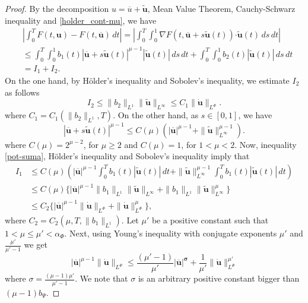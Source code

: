 \documentclass[twoside]{article}
\theoremstyle{remark}
\newcommand{\orlnor}{\|_{L^{\Phi}}}
\renewcommand{\b}[1]{\boldsymbol{#1}}
\newcommand{\ccdot}{\b{\cdot}}
\renewcommand{\leq}{\leqslant}
\begin{document}
\begin{proof} 
By the decomposition $u=\overline{u}+\b{\tilde{u}}$,  Mean Value Theorem, Cauchy-Schwarz inequality 
and \eqref{holder_cont-mu}, we have
\begin{equation}\label{cota-diferencia-F}
\begin{split}
&\left|\int_0^T F(t,\b{u})-F(t,\b{\overline{u}})\,dt\right|=
\left|\int_0^T \int_0^1 \nabla F(t,\b{\overline{u}}+s\b{\tilde{u}}(t))\ccdot \b{\tilde{u}}(t) \,ds \,dt\right|
\\
&\leq \int_0^T \int_0^1 b_1(t)|\b{\overline{u}}+s\b{\tilde{u}}(t)|^{\mu-1}|\b{\tilde{u}}(t)|\,ds\,dt+
\int_0^T \int_0^1 b_2(t)|\b{\tilde{u}}(t)|\,ds\,dt
\\
&=I_1+I_2.
\end{split}
\end{equation}
On the one hand, by H\"older's inequality and Sobolev's inequality, we estimate $I_2$ as follows
\begin{equation}\label{cota-i2}
I_2\leq \|b_2\|_{L^1} \|\b{\tilde{u}}\|_{L^{\infty}}\leq
C_1\|\b{\dot u}\orlnor.
\end{equation}
 where $C_1=C_1(\|b_2\|_{L^1}, T)$. On the other hand, as $s\in [0,1]$, we have
\begin{equation}\label{pot-suma}
|\b{\overline{u}}+s\b{\tilde{u}}(t)|^{\mu-1}\leq
C(\mu)(|\b{\overline{u}}|^{\mu-1}+\|\b{\tilde{u}}\|_{L^{\infty}}^{\mu-1}).
\end{equation}
where $C(\mu)=2^{\mu-2}$, for $\mu\geq 2$ and $C(\mu)=1$, for $1<\mu<2$. Now,  inequality \eqref{pot-suma}, H\"older's inequality and Sobolev's inequality imply that
\begin{equation}\label{cota-i1}
\begin{split}
I_1&\leq 
C(\mu)\left(|\b{\overline{u}}|^{\mu-1} \int_0^T b_1(t) |\b{\tilde{u}}(t)|\,dt+
\|\b{\tilde{u}}\|^{\mu-1}_{L^{\infty}} \int_0^T b_1(t)|\b{\tilde{u}}(t)| \,dt\right)
\\
&\leq C(\mu)\bigg\{ |\b{\overline{u}}|^{\mu-1} \|b_1\|_{L^1} \|\b{\tilde{u}}\|_{L^{\infty}}+
 \|b_1\|_{L^1}\|\b{\tilde{u}}\|^{\mu}_{L^\infty}\bigg\}
\\
&\leq C_2 \bigg\{ |\b{\overline{u}}|^{\mu-1} \|\b{\dot{u}}\orlnor+ \|\b{\dot u}\orlnor^{\mu}\bigg\},
\end{split}
\end{equation}
where $C_2=C_2(\mu,T, \|b_1\|_{L^1} )$. Let $\mu'$ be a positive constant such that $1<\mu\leq \mu'<\alpha_{\Phi}$. 
Next, using Young's inequality with conjugate exponents $\mu'$ and $\frac{\mu'}{\mu'-1}$ 
 we get
\begin{equation}\label{cota-i1-parcial}
|\b{\overline{u}}|^{\mu-1}   \|\b{\dot{u}}\orlnor
\leq \frac{(\mu'-1)}{\mu'}|\b{\overline{u}|^{\sigma}}
+\frac{1}{\mu'} \|\b{\dot{u}}\orlnor^{\mu'}
\end{equation}
where $\sigma=\frac{(\mu-1) \mu'}{\mu'-1}$. We note that $\sigma$ is an arbitrary positive constant bigger than $(\mu-1)b_{\Psi}$.


\end{proof}
\end{document}
